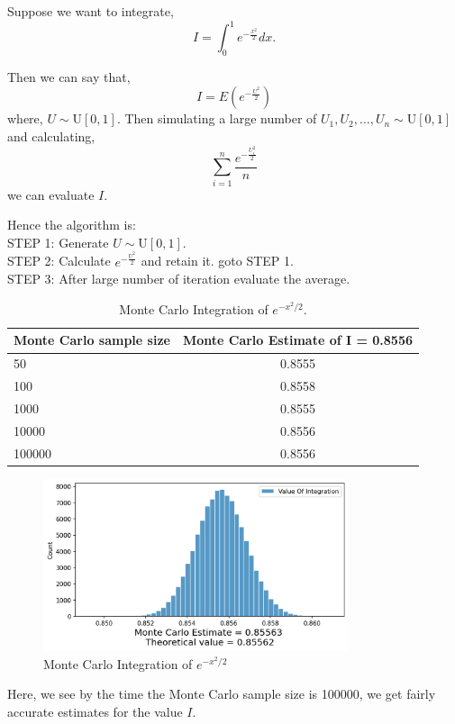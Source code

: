\begin{example}
	Suppose we want to integrate,
	\[
		I = \int_{0}^{1} e^{-\frac{x ^{2}}{2}} dx.
	\]

	Then we can say that,
	\[
		I = E(e^{-\frac{U ^{2}}{2}})
	\]
    where, $U\sim \text{U}[0,1]$. Then simulating a large number of $U_1, U_2, \ldots, U_n\sim \text{U}[0,1]$ and calculating,
	\[
		\sum_{i = 1}^{n}  \frac{e^{-\frac{U_i ^{2}}{2}}}{n}
	\]
	we can evaluate $I$.

	Hence the algorithm is:\\
    STEP 1: Generate $U\sim \text{U}[0,1]$. \\
	STEP 2: Calculate $ e^{-\frac{U ^{2}}{2}} $ and retain it. goto STEP 1. \\
	STEP 3: After large number of iteration evaluate the average.
	\begin{table}[H]
		\begin{center}
			\begin{tabular}{l c}
				\hline
				Monte Carlo sample size & Monte Carlo Estimate of I = 0.8556 \\
				\hline
				50                      & 0.8555                              \\
				100                     & 0.8558                              \\
				1000                    & 0.8555                              \\
				10000                   & 0.8556                              \\
				100000                  & 0.8556                              \\
				\hline
			\end{tabular}
			\caption{Monte Carlo Integration of $e^{-x ^{2}/2}$.}
		\end{center}
	\end{table}
	\begin{figure}[H]
		\centering
		\includegraphics[width=0.8\textwidth]{images/evaluating_integration.png}
		\caption{Monte Carlo Integration of $e^{-x ^{2}/2} $}
	\end{figure}
	Here, we see by the time the Monte Carlo sample size is 100000, we get fairly
	accurate estimates for the value $I$.
\end{example}


